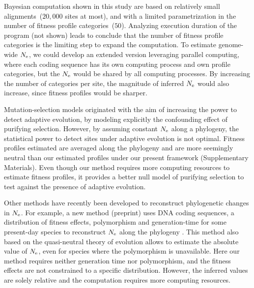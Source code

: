 Bayesian computation shown in this study are based on relatively small alignments~($20,000$ sites at most), and with a limited parametrization in the number of fitness profile categories~($50$).
Analyzing execution duration of the program (not shown) leads to conclude that the number of fitness profile categories is the limiting step to expand the computation.
To estimate genome-wide $N_{\mathrm{e}}$, we could develop an extended version leveraging parallel computing, where each coding sequence has its own computing process and own profile categories, but the $N_{\mathrm{e}}$ would be shared by all computing processes.
By increasing the number of categories per site, the magnitude of inferred $N_{\mathrm{e}}$ would also increase, since fitness profiles would be sharper.

Mutation-selection models originated with the aim of increasing the power to detect adaptive evolution, by modeling explicitly the confounding effect of purifying selection.
However, by assuming constant $N_{\mathrm{e}}$ along a phylogeny, the statistical power to detect sites under adaptive evolution is not optimal.
Fitness profiles estimated are averaged along the phylogeny and are more seemingly \gls{neutral} than our estimated profiles under our present framework (Supplementary Materials).
Even though our method requires more computing resources to estimate fitness profiles, it provides a better null model of purifying selection to test against the presence of adaptive evolution.

Other methods have recently been developed to reconstruct phylogenetic changes in $N_{\mathrm{e}}$.
For example, a new method (preprint) uses \acrshort{DNA} coding sequences, a distribution of fitness effects, polymorphism and generation-time for some present-day species to reconstruct $N_{\mathrm{e}}$ along the phylogeny \citep{Brevet2019}.
This method also based on the quasi-neutral theory of evolution allows to estimate the absolute value of $N_{\mathrm{e}}$, even for species where the polymorphism is unavailable.
Here our method requires neither generation time nor polymorphism, and the fitness effects are not constrained to a specific distribution.
However, the inferred values are solely relative and the computation requires more computing resources.


